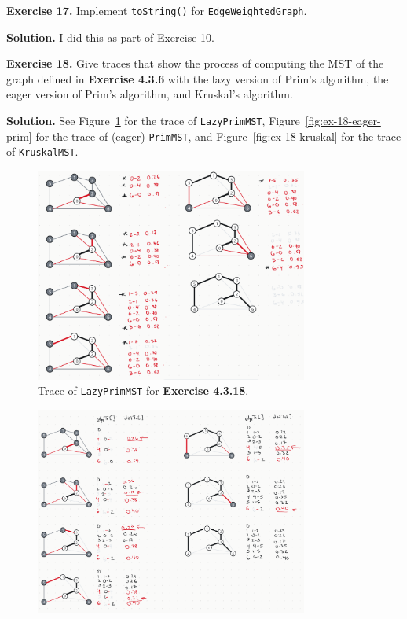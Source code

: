 \documentclass[12pt, a4paper]{article}
\newenvironment{ex}[2][Exercise]
{\par\medskip\noindent \textbf{#1 #2.}}
{\medskip}
\newenvironment{sol}[1][Solution]
{\par\medskip\noindent \textbf{#1.} }
{\medskip}
\begin{document}
	\begin{ex}{17}
		Implement \texttt{toString()} for \texttt{EdgeWeightedGraph}.
	\end{ex}
	\begin{sol}
		I did this as part of Exercise 10.
	\end{sol}
	\begin{ex}{18}
		Give traces that show the process of computing the MST of the graph defined in
		\textbf{Exercise 4.3.6} with the lazy version of Prim's algorithm, the eager
		version of Prim's algorithm, and Kruskal's algorithm.
	\end{ex}
	\begin{sol}
		See Figure~\ref{fig:ex-18-lazy-prim} for the trace of \texttt{LazyPrimMST},
		Figure~\ref{fig:ex-18-eager-prim} for the trace of (eager) \texttt{PrimMST},
		and Figure~\ref{fig:ex-18-kruskal} for the trace of \texttt{KruskalMST}.
		\begin{figure}
			\centering
			\includegraphics[width=0.8\textwidth]{exercise-18-lazy-prim}
			\caption{Trace of \texttt{LazyPrimMST} for \textbf{Exercise 4.3.18}.}
			\label{fig:ex-18-lazy-prim}
		\end{figure}
		\begin{figure}
			\centering
			\includegraphics[width=0.8\textwidth]{exercise-18-eager-prim}

\end{figure}
\end{sol}
\end{document}
